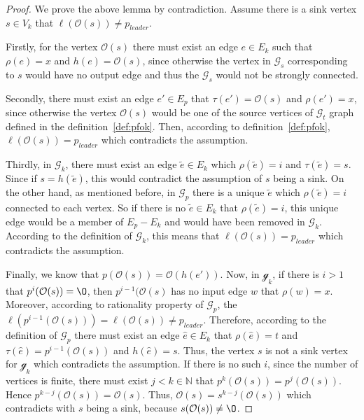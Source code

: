 \begin{proof}
We prove the above lemma by contradiction. Assume there is a sink vertex $s \in V_k$ that $\ell(\mathcal{O}(s)) \neq p_{leader}$. 

Firstly, for the vertex $\mathcal{O}(s)$ there must exist an edge $e \in E_k$ such that $\rho(e)=x$ and $h(e)=\mathcal{O}(s)$, since otherwise the vertex in $\mathcal{G}_s$ corresponding to $s$ would have no output edge and thus the $\mathcal{G}_{s}$ would not be strongly connected.

Secondly, there must exist an edge $e' \in E_p$ that $\tau(e')=\mathcal{O}(s)$ and $\rho(e')=x$, since otherwise the vertex $\mathcal{O}(s)$ would be one of the source vertices of $\mathcal{G}_{t}$ graph defined in the definition~\ref{def:pfok}. Then, according to definition~\ref{def:pfok}, $\ell(\mathcal{O}(s)) = p_{leader}$ which contradicts the assumption. 

Thirdly, in $\mathcal{G}_k$, there must exist an edge $\tilde{e} \in E_k$ which $\rho(\tilde{e})=i$ and $\tau(\tilde{e}) = s$. Since if $s = h(\tilde{e})$, this would contradict the assumption of $s$ being a sink. On the other hand, as mentioned before, in $\mathcal{G}_{p}$ there is a unique $\tilde{e}$ which $\rho(\tilde{e})=i$ connected to each vertex. So if there is no $\tilde{e} \in E_k$ that $\rho(\tilde{e})=i$, this unique edge would be a member of $E_p - E_k$ and would
have been removed in $\mathcal{G}_k$. According to the definition of $\mathcal{G}_k$, this means that $\ell(\mathcal{O}(s)) = p_{leader}$ which contradicts the assumption.

Finally, we know that $p(\mathcal{O}(s)) = \mathcal{O}(h(e'))$. Now, in $\mathcal{g}_k$, if there is $i > 1$ that $p^{i}(\mathcal{O}(s)) = \O$, then $p^{i-1}(\mathcal{O}(s)$ has no input edge $w$ that $\rho(w) = x$. Moreover, according to rationality property of $\mathcal{G}_{p}$, the $\ell(p^{i-1}(\mathcal{O}(s))) = \ell(\mathcal{O}(s)) \neq p_{leader}$. Therefore, according to the definition of $\mathcal{G}_{p}$ there must exist an edge $\hat{e} \in E_k$ that $\rho(\hat{e})=t$ and $\tau(\hat{e}) = p^{i-1}(\mathcal{O}(s))$ and $h(\hat{e})=s$. Thus, the vertex $s$ is not a sink vertex for $\mathcal{g}_k$ which contradicts the assumption. If there is no such $i$, since the number of vertices is finite, there must exist $j < k \in \mathbb{N}$ that $p^{k}(\mathcal{O}(s)) = p^{j}(\mathcal{O}(s))$. Hence $p^{k-j}(\mathcal{O}(s)) = \mathcal{O}(s)$. Thus, $\mathcal{O}(s) = s^{k-j}(\mathcal{O}(s))$ which contradicts with $s$ being a sink, because $s(\mathcal{O}(s)) \neq \O$. 
\end{proof}



